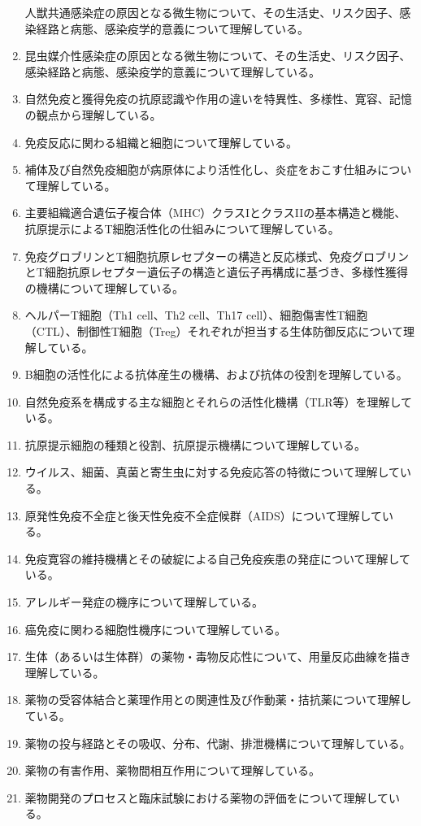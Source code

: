\begin{enumerate}
  人獣共通感染症の原因となる微生物について、その生活史、リスク因子、感染経路と病態、感染疫学的意義について理解している。
\item
  昆虫媒介性感染症の原因となる微生物について、その生活史、リスク因子、感染経路と病態、感染疫学的意義について理解している。
\item
  自然免疫と獲得免疫の抗原認識や作用の違いを特異性、多様性、寛容、記憶の観点から理解している。
\item
  免疫反応に関わる組織と細胞について理解している。
\item
  補体及び自然免疫細胞が病原体により活性化し、炎症をおこす仕組みについて理解している。
\item
  主要組織適合遺伝子複合体（MHC）クラスIとクラスIIの基本構造と機能、抗原提示によるT細胞活性化の仕組みについて理解している。
\item
  免疫グロブリンとT細胞抗原レセプターの構造と反応様式、免疫グロブリンとT細胞抗原レセプター遺伝子の構造と遺伝子再構成に基づき、多様性獲得の機構について理解している。
\item
  ヘルパーT細胞（Th1 cell、Th2 cell、Th17
  cell）、細胞傷害性T細胞（CTL）、制御性T細胞（Treg）それぞれが担当する生体防御反応について理解している。
\item
  B細胞の活性化による抗体産生の機構、および抗体の役割を理解している。
\item
  自然免疫系を構成する主な細胞とそれらの活性化機構（TLR等）を理解している。
\item
  抗原提示細胞の種類と役割、抗原提示機構について理解している。
\item
  ウイルス、細菌、真菌と寄生虫に対する免疫応答の特徴について理解している。
\item
  原発性免疫不全症と後天性免疫不全症候群（AIDS）について理解している。
\item
  免疫寛容の維持機構とその破綻による自己免疫疾患の発症について理解している。
\item
  アレルギー発症の機序について理解している。
\item
  癌免疫に関わる細胞性機序について理解している。
\item
  生体（あるいは生体群）の薬物・毒物反応性について、用量反応曲線を描き理解している。
\item
  薬物の受容体結合と薬理作用との関連性及び作動薬・拮抗薬について理解している。
\item
  薬物の投与経路とその吸収、分布、代謝、排泄機構について理解している。
\item
  薬物の有害作用、薬物間相互作用について理解している。
\item
  薬物開発のプロセスと臨床試験における薬物の評価をについて理解している。
\end{enumerate}


